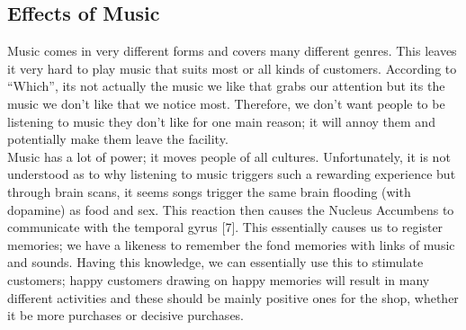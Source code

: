 \subsection{Effects of Music}
Music comes in very different forms and covers many different genres.  This leaves it very hard to play music that suits most or all kinds of customers.  According to ``Which'', its not actually the music we like that grabs our attention but its the music we don't like that we notice most.   Therefore, we don't want people to be listening to music they don't like for one main reason; it will annoy them and potentially make them leave the facility.  \\

Music has a lot of power; it moves people of all cultures.  Unfortunately, it is not understood as to why listening to music triggers such a rewarding experience but through brain scans, it seems songs trigger the same brain flooding (with dopamine) as food and sex.  This reaction then causes the Nucleus Accumbens to communicate with the temporal gyrus [7].  This essentially causes us to register memories; we have a likeness to remember the fond memories with links of music and sounds.  Having this knowledge, we can essentially use this to stimulate customers; happy customers drawing on happy memories will result in many different activities and these should be mainly positive ones for the shop, whether it be more purchases or decisive purchases.  \\

